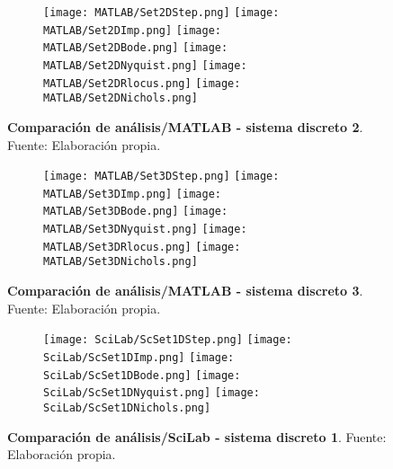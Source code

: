     \begin{figure}[htb]
        \centering
        \begin{subfigure}[t]{0.99\textwidth}
            \centering
            \texttt{[image: MATLAB/Set2DStep.png]}
            \texttt{[image: MATLAB/Set2DImp.png]}
            \texttt{[image: MATLAB/Set2DBode.png]}
            \texttt{[image: MATLAB/Set2DNyquist.png]}
            \texttt{[image: MATLAB/Set2DRlocus.png]}
            \texttt{[image: MATLAB/Set2DNichols.png]}
            \label{fig:Set2Dsub}
        \end{subfigure}
        \caption[Comparación de análisis/MATLAB - sistema discreto 2]{\textbf{Comparación de análisis/MATLAB - sistema discreto 2}. Fuente: Elaboración propia. \label{fig:Set2D}}
    \end{figure}

    \begin{figure}[htb]
        \centering
        \begin{subfigure}[t]{0.99\textwidth}
            \centering
            \texttt{[image: MATLAB/Set3DStep.png]}
            \texttt{[image: MATLAB/Set3DImp.png]}
            \texttt{[image: MATLAB/Set3DBode.png]}
            \texttt{[image: MATLAB/Set3DNyquist.png]}
            \texttt{[image: MATLAB/Set3DRlocus.png]}
            \texttt{[image: MATLAB/Set3DNichols.png]}
            \label{fig:Set3Dsub}
        \end{subfigure}
        \caption[Comparación de análisis/MATLAB - sistema discreto 3]{\textbf{Comparación de análisis/MATLAB - sistema discreto 3}. Fuente: Elaboración propia. \label{fig:Set3D}}
    \end{figure}

    \begin{figure}[htb]
        \centering
        \begin{subfigure}[t]{0.99\textwidth}
            \centering
            \texttt{[image: SciLab/ScSet1DStep.png]}
            \texttt{[image: SciLab/ScSet1DImp.png]}
            \texttt{[image: SciLab/ScSet1DBode.png]}
            \texttt{[image: SciLab/ScSet1DNyquist.png]}
            \texttt{[image: SciLab/ScSet1DNichols.png]}
            \label{fig:ScSet1Dsub}
        \end{subfigure}
        \caption[Comparación de análisis/SciLab - sistema discreto 1]{\textbf{Comparación de análisis/SciLab - sistema discreto 1}. Fuente: Elaboración propia. \label{fig:ScSet1D}}
    \end{figure}

